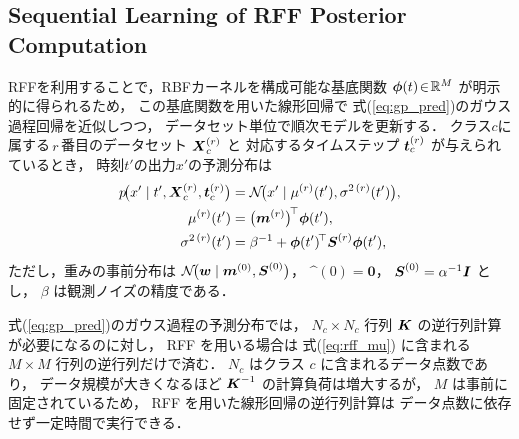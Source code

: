 \documentclass[conference]{IEEEtran}
\begin{document}

\subsection{Sequential Learning of RFF Posterior Computation}
RFFを利用することで，RBFカーネルを構成可能な基底関数
${\boldsymbol\phi}(t)\!\in\!\mathbb{R}^{M}$ が明示的に得られるため，
この基底関数を用いた線形回帰で
式(\ref{eq:gp_pred})のガウス過程回帰を近似しつつ，
データセット単位で順次モデルを更新する．
クラス$c$に属する\,$r$\,番目のデータセット  
${ \boldsymbol X}_c^{(r)}$ と
対応するタイムステップ  
${ \boldsymbol t}_c^{(r)}$ が与えられているとき，
時刻$t'$の出力$x'$の予測分布は
\begin{align}
  p\!\bigl(x' \mid t', \bX_c^{(r)}, \bt_c^{(r)}\bigr)
    &= \mathcal{N}\!\bigl(x' \mid \mu^{(r)}(t'), \sigma^{2\,(r)}(t')\bigr),\\
  \mu^{(r)}(t') &= \bigl(\bm^{(r)}\bigr)^{\!\top}\bphi(t')\label{eq:rff_mu},\\
  \sigma^{2\,(r)}(t') &= \beta^{-1}
                        + \bphi(t')^{\!\top}\bS^{(r)}\bphi(t'),
\end{align}
ただし，重みの事前分布は  
$\mathcal{N}\!\bigl({ \boldsymbol w}\mid{ \boldsymbol m}^{(0)},{ \boldsymbol S}^{(0)}\bigr)$，
$\bm^{(0)}=\mathbf{0}$，
${ \boldsymbol S}^{(0)}=\alpha^{-1}{ \boldsymbol I}$ とし，
$\beta$ は観測ノイズの精度である．

式(\ref{eq:gp_pred})のガウス過程の予測分布では，
$N_c\times N_c$ 行列 ${ \boldsymbol K}$ の逆行列計算が必要になるのに対し，
RFF を用いる場合は
式(\ref{eq:rff_mu}) に含まれる
$M\times M$ 行列の逆行列だけで済む．
$N_c$ はクラス $c$ に含まれるデータ点数であり，
データ規模が大きくなるほど ${ \boldsymbol K}^{-1}$ の計算負荷は増大するが，
$M$ は事前に固定されているため，
RFF を用いた線形回帰の逆行列計算は
データ点数に依存せず一定時間で実行できる．
\end{document}
